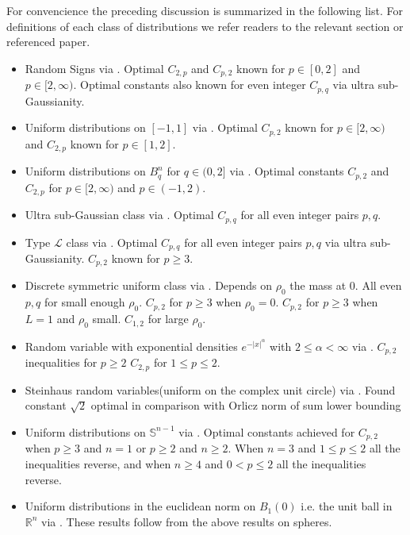 \documentclass[10pt]{article}
\newcommand{\1}{\textbf{1}}
\newcommand{\R}{\mathbb{R}}
\theoremstyle{remark}
\theoremstyle{definition}
\begin{document}
For convencience the preceding discussion is summarized in the following list. For definitions of each class of distributions we refer readers to the relevant section or referenced paper. 

\begin{itemize}
	\item Random Signs via \cite{H}. Optimal $C_{2,p}$ and $C_{p,2}$ known for $p \in [0,2]$ and $p \in [2,\infty)$. Optimal constants also known for even integer $C_{p,q}$ via ultra sub-Gaussianity.
	\item Uniform distributions on $[-1,1]$ via \cite{LO}. Optimal $C_{p,2}$ known for $p \in [2,\infty)$ and $C_{2,p}$ known for $p \in [1,2]$.
	\item Uniform distributions on $B_q^n$ for $q \in (0,2]$ via \cite{ENT}. Optimal constants $C_{p,2}$ and $C_{2,p}$ for $p \in [2,\infty)$ and $p \in (-1,2)$. 
	\item Ultra sub-Gaussian class via \cite{NO}. Optimal $C_{p,q}$ for all even integer pairs $p,q$. 
	\item Type $\mathcal{L}$ class via \cite{HNT}. Optimal $C_{p,q}$ for all even integer pairs $p,q$ via ultra sub-Gaussianity. $C_{p,2}$ known for $p \geq 3$. 
	\item Discrete symmetric uniform class via \cite{HT}. Depends on $\rho_0$ the mass at 0. All even $p,q$ for small enough $\rho_0$. $C_{p,2}$ for $p \geq 3$ when $\rho_0 = 0$. $C_{p,2}$ for $p \geq 3$ when $L=1$ and $\rho_0$ small. $C_{1,2}$ for large $\rho_0$.
	\item Random variable with exponential densities $e^{-|x|^{\alpha}}$ with $2 \leq \alpha < \infty$ via \cite{ENT2}. $C_{p,2}$ inequalities for $p \geq 2$ $C_{2,p}$ for $1 \leq p \leq 2$. 
	\item Steinhaus random variables(uniform on the complex unit circle) via \cite{P}. Found constant $\sqrt{2}$ optimal in comparison with Orlicz norm of sum lower bounding 
	\item Uniform distributions on $\mathbb{S}^{n-1}$ via \cite{BC}. Optimal constants achieved for $C_{p,2}$ when $p \geq 3$ and $n = 1$ or $p \geq 2$ and $n \geq 2$. When $n=3$ and $1 \leq p \leq 2$ all the inequalities reverse, and when $n \geq 4$ and $0 < p \leq 2$ all the inequalities reverse.
	\item Uniform distributions in the euclidean norm on $B_{1}(0)$ i.e. the unit ball in $\R^n$ via \cite{BC}. These results follow from the above results on spheres.
\end{itemize}
\end{document}
